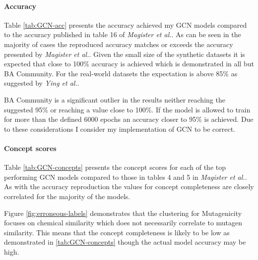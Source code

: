 \paragraph{Accuracy}

Table \ref{tab:GCN-acc} presents the accuracy achieved my GCN models compared to the accuracy published in table 16 of \textit{Magister et al.}\cite{magister2021gcexplainer}.
As can be seen in the majority of cases the reproduced accuracy matches or exceeds the accuracy presented by \textit{Magister et al.}.
Given the small size of the synthetic datasets it is expected that close to 100\% accuracy is achieved which is demonstrated in all but BA Community.
For the real-world datasets the expectation is above 85\% as suggested by \textit{Ying et al.}\cite{ying2019gnnexplainer}.

BA Community is a significant outlier in the results neither reaching the suggested 95\% or reaching a value close to 100\%.
If the model is allowed to train for more than the defined 6000 epochs an accuracy closer to 95\% is achieved.
Due to these considerations I consider my implementation of GCN to be correct.

\paragraph{Concept scores}

Table \ref{tab:GCN-concepts} presents the concept scores for each of the top performing GCN models compared to those in tables 4 and 5 in \textit{Magister et al.}.
As with the accuracy reproduction the values for concept completeness are closely correlated for the majority of the models.


Figure \ref{fig:erroneous-labels} demonstrates that the clustering for Mutagenicity focuses on chemical similarity which does not necessarily correlate to mutagen similarity.
This means that the concept completeness is likely to be low as demonstrated in \ref{tab:GCN-concepts} though the actual model accuracy may be high.

